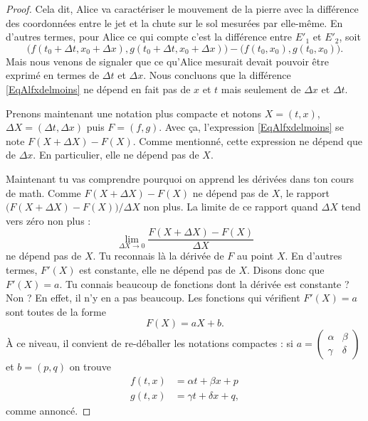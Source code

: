 \begin{proof}
	Cela dit, Alice va caractériser le mouvement de la pierre avec la différence des coordonnées entre le jet et la chute sur le sol mesurées par elle-même. En d'autres termes, pour Alice ce qui compte c'est la différence entre \( E'_1\) et \( E'_2\), soit
	\begin{equation}	\label{EqAlfxdelmoins}
		\big( f(t_0+\Delta t,x_0+\Delta x), g(t_0+\Delta t,x_0+\Delta x) \big)-\big( f(t_0,x_0),g(t_0,x_0) \big).
	\end{equation}
	Mais nous venons de signaler que ce qu'Alice mesurait devait pouvoir être exprimé en termes de \( \Delta t\) et \( \Delta x\). Nous concluons que la différence \eqref{EqAlfxdelmoins} ne dépend en fait pas de \( x\) et \( t\) mais seulement de \( \Delta x\) et \( \Delta t\).

	Prenons maintenant une notation plus compacte et notons \( X=(t,x)\), \( \Delta X=(\Delta t,\Delta x)\) puis \( F=(f,g)\). Avec ça, l'expression \eqref{EqAlfxdelmoins} se note \( F(X+\Delta X)-F(X)\). Comme mentionné, cette expression ne dépend que de \( \Delta x\). En particulier, elle ne dépend pas de \( X\).

	Maintenant tu vas comprendre pourquoi on apprend les dérivées dans ton cours de math. Comme \( F(X+\Delta X)-F(X)\) ne dépend pas de \( X\), le rapport \( \big( F(X+\Delta X)-F(X) \big)/\Delta X\) non plus. La limite de ce rapport quand \( \Delta X\) tend vers zéro non plus :
	\begin{equation}
		\lim_{\Delta X\to 0}\frac{ F(X+\Delta X)-F(X) }{ \Delta X }
	\end{equation}
	ne dépend pas de \( X\). Tu reconnais là la dérivée de \( F\) au point \( X\). En d'autres termes, \( F'(X)\) est constante, elle ne dépend pas de \( X\). Disons donc que \( F'(X)=a\). Tu connais beaucoup de fonctions dont la dérivée est constante ? Non ? En effet, il n'y en a pas beaucoup. Les fonctions qui vérifient \( F'(X)=a\) sont toutes de la forme
	\[
		F(X)=aX+b.
	\]
	À ce niveau, il convient de re-déballer les notations compactes : si \( a=\begin{pmatrix}
		\alpha & \beta \\\gamma&\delta
	\end{pmatrix}\) et \( b=(p,q)\) on trouve
	\begin{subequations}		\label{EqLoUn}
		\begin{align}
			f(t,x) & =\alpha t+\beta x+p   \\
			g(t,x) & =\gamma t+\delta x+q,
		\end{align}
	\end{subequations}
	comme annoncé.

\end{proof}


